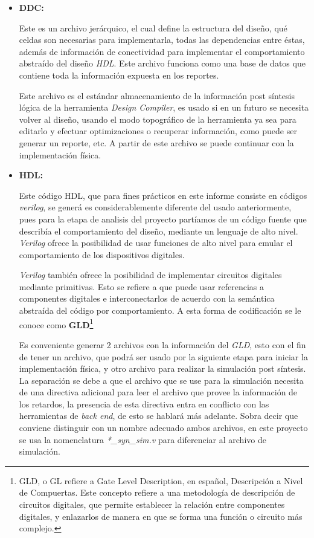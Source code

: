 \begin{itemize}
\item \textbf{DDC:} {Este es un archivo jerárquico, el cual define la estructura del diseño, qué celdas son necesarias para implementarla, todas las dependencias entre éstas, además de información de conectividad para implementar el comportamiento abstraído del diseño \textit{HDL}. Este archivo funciona como una base de datos que contiene toda la información expuesta en los reportes.

Este archivo es el estándar almacenamiento de la información post síntesis lógica de la herramienta \textit{Design Compiler}, es usado si en un futuro se necesita volver al diseño, usando el modo topográfico de la herramienta ya sea para editarlo y efectuar optimizaciones o recuperar información, como puede ser generar un reporte, etc. A partir de este archivo se puede continuar con la implementación física.}

\item \textbf{HDL:} {Este código HDL, que para fines prácticos en este informe consiste en códigos \textit{verilog}, se generá es considerablemente diferente del usado anteriormente, pues para la etapa de analisis del proyecto partíamos de un código fuente que describía el comportamiento del diseño, mediante un lenguaje de alto nivel. \textit{Verilog} ofrece la posibilidad de usar funciones de alto nivel para emular el comportamiento de los dispositivos digitales.

\textit{Verilog} también ofrece la posibilidad de implementar circuitos digitales mediante primitivas. Esto se refiere a que puede usar referencias a componentes digitales e interconectarlos de acuerdo con la semántica abstraída del código por comportamiento. A esta forma de codificación se le conoce como \textbf{GLD}\footnote{GLD, o GL refiere a Gate Level Description, en español, Descripción a Nivel de Compuertas. Este concepto refiere a una metodología de descripción de circuitos digitales, que permite establecer la relación entre componentes digitales, y enlazarlos de manera en que se forma una función o circuito más complejo.}

Es conveniente generar 2 archivos con la información del \textit{GLD}, esto con el fin de tener un archivo, que podrá ser usado por la siguiente etapa para iniciar la implementación física, y otro archivo para realizar la simulación post síntesis. La separación se debe a que el archivo que se use para la simulación necesita de una directiva adicional para leer el archivo que provee la información de los retardos, la presencia de esta directiva entra en conflicto con las herramientas de \textit{back end}, de esto se hablará más adelante. Sobra decir que conviene distinguir con un nombre adecuado ambos archivos, en este proyecto se usa la nomenclatura \textit{*\_syn\_sim.v} para diferenciar al archivo de simulación.}


\end{itemize}
